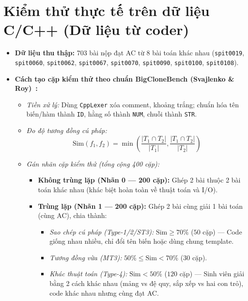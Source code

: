 \documentclass[11pt,a4paper]{article}
\begin{document}
\section{Kiểm thử thực tế trên dữ liệu C/C++ (Dữ liệu từ coder)}
\begin{itemize}
\item \textbf{Dữ liệu thu thập:} 703 bài nộp đạt AC từ 8 bài toán khác nhau (\texttt{spit0019}, \texttt{spit0060}, \texttt{spit0062}, \texttt{spit0067}, \texttt{spit0070}, \texttt{spit0090}, \texttt{spit0100}, \texttt{spit0108}).
\item \textbf{Cách tạo cặp kiểm thử theo chuẩn BigCloneBench (Svajlenko \& Roy)~\cite{svajlenko2014}:}
  \begin{itemize}[label=--]
    \item \textit{Tiền xử lý:} Dùng \texttt{CppLexer} xóa comment, khoảng trắng; chuẩn hóa tên biến/hàm thành \texttt{ID}, hằng số thành \texttt{NUM}, chuỗi thành \texttt{STR}.
    \item \textit{Đo độ tương đồng cú pháp:}
      $$\text{Sim}(f_1, f_2) = \min\left( \frac{|T_1 \cap T_2|}{|T_1|}, \frac{|T_1 \cap T_2|}{|T_2|} \right)$$
    \item \textit{Gán nhãn cặp kiểm thử (tổng cộng 400 cặp):}
      \begin{itemize}
        \item \textbf{Không trùng lặp (Nhãn 0 --- 200 cặp):} Ghép 2 bài thuộc 2 bài toán khác nhau (khác biệt hoàn toàn về thuật toán và I/O).
        \item \textbf{Trùng lặp (Nhãn 1 --- 200 cặp):} Ghép 2 bài cùng giải 1 bài toán (cùng AC), chia thành:
          \begin{itemize}
            \item \textit{Sao chép cú pháp (Type-1/2/ST3):} $\text{Sim} \ge 70\%$ ($50$ cặp) --- Code giống nhau nhiều, chỉ đổi tên biến hoặc dùng chung template.
            \item \textit{Tương đồng vừa (MT3):} $50\% \le \text{Sim} < 70\%$ ($30$ cặp).
            \item \textit{Khác thuật toán (Type-4):} $\text{Sim} < 50\%$ ($120$ cặp) --- Sinh viên giải bằng 2 cách khác nhau (mảng vs đệ quy, sắp xếp vs hai con trỏ), code khác nhau nhưng cùng đạt AC.
          \end{itemize}
      \end{itemize}
  \end{itemize}
\end{itemize}
\end{document}
